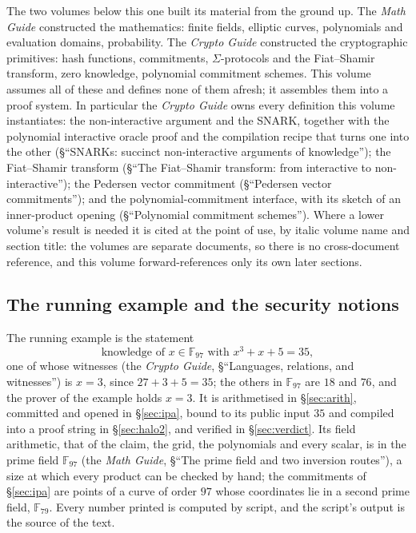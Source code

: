 \documentclass[11pt,a4paper]{article}
\theoremstyle{definition}
\newcommand{\F}{\mathbb{F}}
\begin{document}
The two volumes below this one built its material from the ground up.
The \emph{Math Guide} constructed the mathematics: finite fields,
elliptic curves, polynomials and evaluation domains, probability. The
\emph{Crypto Guide} constructed the cryptographic primitives: hash
functions, commitments, $\Sigma$-protocols and the Fiat--Shamir
transform, zero knowledge, polynomial commitment schemes. This volume
assumes all of these and defines none of them afresh; it assembles them
into a proof system. In particular the \emph{Crypto Guide} owns every
definition this volume instantiates: the non-interactive argument and
the SNARK, together with the polynomial interactive oracle proof and the
compilation recipe that turns one into the other
(\S``SNARKs: succinct non-interactive arguments of knowledge''); the
Fiat--Shamir transform (\S``The Fiat--Shamir transform: from interactive
to non-interactive''); the Pedersen vector commitment (\S``Pedersen
vector commitments''); and the polynomial-commitment interface, with
its sketch of an inner-product opening (\S``Polynomial commitment
schemes''). Where a lower volume's result is needed it is cited at the
point of use, by italic volume name and section title: the volumes are
separate documents, so there is no cross-document reference, and this
volume forward-references only its own later sections.

\subsection{The running example and the security notions}
\label{sec:intro-claim}

The running example is the statement
\[
\text{knowledge of } x \in \F_{97} \text{ with } x^3 + x + 5 = 35,
\]
one of whose witnesses (the \emph{Crypto Guide}, \S``Languages,
relations, and witnesses'') is $x = 3$, since $27 + 3 + 5 = 35$; the
others in $\F_{97}$ are $18$ and $76$, and the prover of the example
holds $x = 3$. It is arithmetised
in \S\ref{sec:arith}, committed and opened in \S\ref{sec:ipa}, bound to
its public input $35$ and compiled into a proof string in
\S\ref{sec:halo2}, and verified in \S\ref{sec:verdict}. Its field
arithmetic, that of the claim, the grid, the polynomials and every
scalar, is in the prime field $\F_{97}$ (the \emph{Math Guide},
\S``The prime field and two inversion routes''), a size at which every
product can be checked by hand; the commitments of \S\ref{sec:ipa} are
points of a curve of order $97$ whose coordinates lie in a second prime
field, $\F_{79}$. Every number printed is computed by script, and the
script's output is the source of the text.
\end{document}
